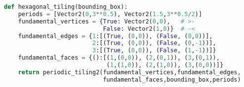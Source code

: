 \documentclass[a4paper]{article}
\begin{document}
\ttfamily
\thispagestyle{empty}
\begin{lstlisting}[language=Python]
def hexagonal_tiling(bounding_box):
    periods = [Vector2(0,3**0.5), Vector2(1.5,3**0.5/2)]
    fundamental_vertices = {True: Vector2(0,0),   # >-
                            False: Vector2(1,0)}  # -<
    fundamental_edges = {1:[(True, (0,0)), (False, (0,0))],
                         2:[(True, (0,0)), (False, (0,-1))],
                         3:[(True, (0,0)), (False, (1,-1))]}
    fundamental_faces = {():[(1,(0,0)), (2,(0,1)), (3,(0,1)),
                             (1,(1,0)), (2,(1,0)), (3,(0,0))]}
    return periodic_tiling2(fundamental_vertices,fundamental_edges,
                            fundamental_faces,bounding_box,periods)
\end{lstlisting}
\end{document}
